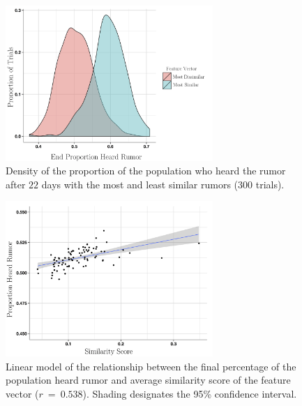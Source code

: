 \begin{figure}[H]
\captionsetup{width=0.8\textwidth}
\centering
    \includegraphics[width=0.7\textwidth]{figures/figure8}
  \caption{ Density of the proportion of the population who heard the rumor after $ 22 $ days with the most and least similar rumors ($ 300 $ trials).}
\label{fig:figure8}
\end{figure}

\begin{figure}[H]
\captionsetup{width=0.8\textwidth}
\centering
    \includegraphics[width=0.7\textwidth]{figures/figure9}
  \caption{ Linear model of the relationship between the final percentage of the population heard rumor and average similarity score of the feature vector ($ r~=~0.538 $).
Shading designates the 95\% confidence interval.}
\label{fig:figure9}
\end{figure}

